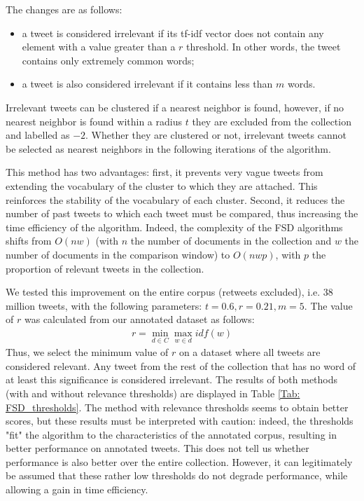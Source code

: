 The changes are as follows: 
\begin{itemize}
    \item a tweet is considered irrelevant if its tf-idf vector does not contain any element with a value greater than a $r$ threshold. In other words, the tweet contains only extremely common words;
    \item  a tweet is also considered irrelevant if it contains less than $m$ words. 
\end{itemize}
Irrelevant tweets can be clustered if a nearest neighbor is found, however, if no nearest neighbor is found within a radius $t$ they are excluded from the collection and labelled as $-2$. Whether they are clustered or not, irrelevant tweets cannot be selected as nearest neighbors in the following iterations of the algorithm. 

This method has two advantages: first, it prevents very vague tweets from extending the vocabulary of the cluster to which they are attached. This reinforces the stability of the vocabulary of each cluster. Second, it reduces the number of past tweets to which each tweet must be compared, thus increasing the time efficiency of the algorithm. Indeed, the complexity of the FSD algorithms shifts from $O(nw)$ (with $n$ the number of documents in the collection and $w$ the number of documents in the comparison window) to $O(nwp)$, with $p$ the proportion of relevant tweets in the collection.

We tested this improvement on the entire corpus (retweets excluded), i.e. 38 million tweets, with the following parameters: $t=0.6, r=0.21, m=5$. The value of $r$ was calculated from our annotated dataset as follows: 
\begin{align*}
r = \min_{d \in C}\max_{w \in d}idf(w)
\end{align*}
Thus, we select the minimum value of $r$ on a dataset where all tweets are considered relevant. Any tweet from the rest of the collection that has no word of at least this significance is considered irrelevant. The results of both methods (with and without relevance thresholds) are displayed in Table \ref{Tab: FSD_thresholds}. The method with relevance thresholds seems to obtain better scores, but these results must be interpreted with caution: indeed, the thresholds "fit" the algorithm to the characteristics of the annotated corpus, resulting in better performance on annotated tweets. This does not tell us whether performance is also better over the entire collection. However, it can legitimately be assumed that these rather low thresholds do not degrade performance, while allowing a gain in time efficiency.

